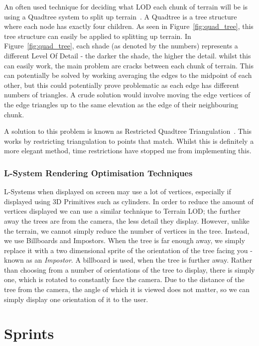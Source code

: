\documentclass[a4paper,10pt]{report}
\begin{document}
An often used technique for deciding what LOD each chunk of terrain will be is using a Quadtree system to split up terrain~\cite{pajarola1998large}. A Quadtree is a tree structure where each node has exactly four children. As seen in Figure~\ref{fig:quad_tree}, this tree structure can easily be applied to splitting up terrain. In Figure~\ref{fig:quad_tree}, each shade (as denoted by the numbers) represents a different Level Of Detail - the darker the shade, the higher the detail. whilst this can easily work, the main problem are cracks between each chunk of terrain. This can potentially be solved by working averaging the edges to the midpoint of each other, but this could potentially prove problematic as each edge has different numbers of triangles. A crude solution would involve moving the edge vertices of the edge triangles up to the same elevation as the edge of their neighbouring chunk. \medskip

A solution to this problem is known as Restricted Quadtree Triangulation~\cite{pajarola1998large}. This works by restricting triangulation to points that match. Whilst this is definitely a more elegant method, time restrictions have stopped me from implementing this. 

\subsection{L-System Rendering Optimisation Techniques}
L-Systems when displayed on screen may use a lot of vertices, especially if displayed using 3D Primitives such as cylinders. In order to reduce the amount of vertices displayed we can use a similar technique to Terrain LOD; the further away the trees are from the camera, the less detail they display. However, unlike the terrain, we cannot simply reduce the number of vertices in the tree. Instead, we use Billboards and Impostors. When the tree is far enough away, we simply replace it with a two dimensional sprite of the orientation of the tree facing you - known as an \textit{Impostor}. A billboard is used, when the tree is further away. Rather than choosing from a number of orientations of the tree to display, there is simply one, which is rotated to constantly face the camera. Due to the distance of the tree from the camera, the angle of which it is viewed does not matter, so we can simply display one orientation of it to the user.


\chapter{Sprints}
\end{document}
